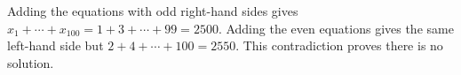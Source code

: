 Adding the equations with odd right-hand sides gives $x_1+\cdots+x_{100}=1+3+\cdots+99=2500$. Adding the even equations gives the same left-hand side but $2+4+\cdots+100=2550$. This contradiction proves there is no solution.
